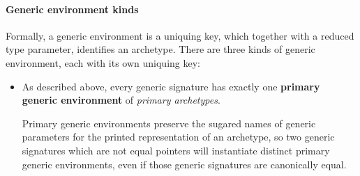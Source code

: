 \documentclass[../generics]{subfiles}
\begin{document}
\paragraph{Generic environment kinds}
%
%
%
%
%
%
%
Formally, a generic environment is a uniquing key, which together with a reduced type parameter, identifies an archetype. There are three kinds of generic environment, each with its own uniquing key:
\begin{itemize}
\item As described above, every generic signature has exactly one \textbf{primary generic environment} of \emph{primary archetypes}.
\begin{quote}
\end{quote}
Primary generic environments preserve the sugared names of generic parameters for the printed representation of an archetype, so two generic signatures which are not equal pointers will instantiate distinct primary generic environments, even if those generic signatures are canonically equal.


\end{itemize}
\end{document}
